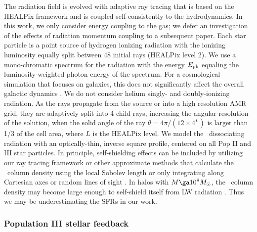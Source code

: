 \documentclass[12pt,preprint]{aastex}
\begin{document}
The radiation field is evolved with adaptive ray tracing
\citep{Abel02_RT, Wise11_Moray} that is based on the HEALPix framework
\citep{HEALPix} and is coupled self-consistently to the hydrodynamics.
In this work, we only consider energy coupling to the gas; we defer an
investigation of the effects of radiation momentum coupling to a
subsequent paper.  Each star particle is a point source of hydrogen
ionizing radiation with the ionizing luminosity equally split between
48 initial rays (HEALPix level 2).  We use a mono-chromatic spectrum
for the radiation with the energy $E_{\rm ph}$ equaling the
luminosity-weighted photon energy of the spectrum.  For a cosmological
simulation that focuses on galaxies, this does not significantly
affect the overall galactic dynamics \citep[see Sec. 6.3
  in][]{Wise11_Moray}.  We do not consider helium singly- and
doubly-ionizing radiation.  As the rays propagate from the source or
into a high resolution AMR grid, they are adaptively split into 4
child rays, increasing the angular resolution of the solution, when
the solid angle of the ray $\theta = 4\pi/(12 \times 4^{L})$ is larger
than 1/3 of the cell area, where $L$ is the HEALPix level.  We model
the \hh~dissociating radiation with an optically-thin, inverse square
profile, centered on all Pop II and III star particles.  In principle,
self-shielding effects can be included by utilizing our ray tracing
framework or other approximate methods that calculate the \hh~column
density using the local Sobolev length \citep{Wolcott11} or only
integrating along Cartesian axes or random lines of sight
\citep{Yoshida03, Yoshida07_HII, Glover07}.  In halos with $M \ga 10^8
\Ms$, the \hh~column density may become large enough to self-shield
itself from LW radiation \citep{Wise08_Gal}.  Thus we may be
underestimating the SFRs in our work.

\subsubsection{Population III stellar feedback}
\end{document}
